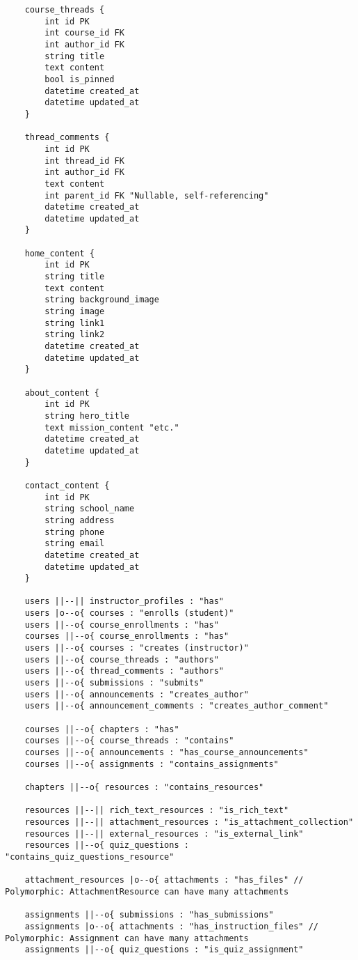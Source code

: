 \begin{verbatim}
    course_threads {
        int id PK
        int course_id FK
        int author_id FK
        string title
        text content
        bool is_pinned
        datetime created_at
        datetime updated_at
    }

    thread_comments {
        int id PK
        int thread_id FK
        int author_id FK
        text content
        int parent_id FK "Nullable, self-referencing"
        datetime created_at
        datetime updated_at
    }

    home_content {
        int id PK
        string title
        text content
        string background_image
        string image
        string link1
        string link2
        datetime created_at
        datetime updated_at
    }

    about_content {
        int id PK
        string hero_title
        text mission_content "etc."
        datetime created_at
        datetime updated_at
    }

    contact_content {
        int id PK
        string school_name
        string address
        string phone
        string email
        datetime created_at
        datetime updated_at
    }

    users ||--|| instructor_profiles : "has"
    users |o--o{ courses : "enrolls (student)"
    users ||--o{ course_enrollments : "has"
    courses ||--o{ course_enrollments : "has"
    users ||--o{ courses : "creates (instructor)"
    users ||--o{ course_threads : "authors"
    users ||--o{ thread_comments : "authors"
    users ||--o{ submissions : "submits"
    users ||--o{ announcements : "creates_author"
    users ||--o{ announcement_comments : "creates_author_comment"

    courses ||--o{ chapters : "has"
    courses ||--o{ course_threads : "contains"
    courses ||--o{ announcements : "has_course_announcements"
    courses ||--o{ assignments : "contains_assignments"

    chapters ||--o{ resources : "contains_resources"

    resources ||--|| rich_text_resources : "is_rich_text"
    resources ||--|| attachment_resources : "is_attachment_collection"
    resources ||--|| external_resources : "is_external_link"
    resources ||--o{ quiz_questions : "contains_quiz_questions_resource"

    attachment_resources |o--o{ attachments : "has_files" // Polymorphic: AttachmentResource can have many attachments

    assignments ||--o{ submissions : "has_submissions"
    assignments |o--o{ attachments : "has_instruction_files" // Polymorphic: Assignment can have many attachments
    assignments ||--o{ quiz_questions : "is_quiz_assignment"


\end{verbatim}
